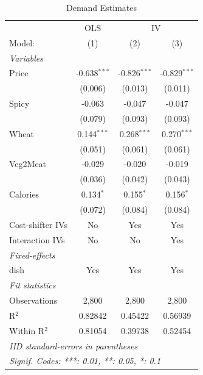 
\begin{table}[H]
   \caption{\label{tab:demand} Demand Estimates}
   \centering
   \begin{tabular}{lccc}
      \tabularnewline \midrule \midrule
       & OLS & \multicolumn{2}{c}{IV} \\ 
      Model:           & (1)            & (2)            & (3)\\  
      \midrule
      \emph{Variables}\\
      Price            & -0.638$^{***}$ & -0.826$^{***}$ & -0.829$^{***}$\\   
                       & (0.006)        & (0.013)        & (0.011)\\   
      Spicy            & -0.063         & -0.047         & -0.047\\   
                       & (0.079)        & (0.093)        & (0.093)\\   
      Wheat            & 0.144$^{***}$  & 0.268$^{***}$  & 0.270$^{***}$\\   
                       & (0.051)        & (0.061)        & (0.061)\\   
      Veg2Meat         & -0.029         & -0.020         & -0.019\\   
                       & (0.036)        & (0.042)        & (0.043)\\   
      Calories         & 0.134$^{*}$    & 0.155$^{*}$    & 0.156$^{*}$\\   
                       & (0.072)        & (0.084)        & (0.084)\\   
      Cost-shifter IVs & No             & Yes            & Yes\\  
      Interaction IVs  & No             & No             & Yes\\  
      \midrule
      \emph{Fixed-effects}\\
      dish             & Yes            & Yes            & Yes\\  
      \midrule
      \emph{Fit statistics}\\
      Observations     & 2,800          & 2,800          & 2,800\\  
      R$^2$            & 0.82842        & 0.45422        & 0.56939\\  
      Within R$^2$     & 0.81054        & 0.39738        & 0.52454\\  
      \midrule \midrule
      \multicolumn{4}{l}{\emph{IID standard-errors in parentheses}}\\
      \multicolumn{4}{l}{\emph{Signif. Codes: ***: 0.01, **: 0.05, *: 0.1}}\\
   \end{tabular}
\end{table}



